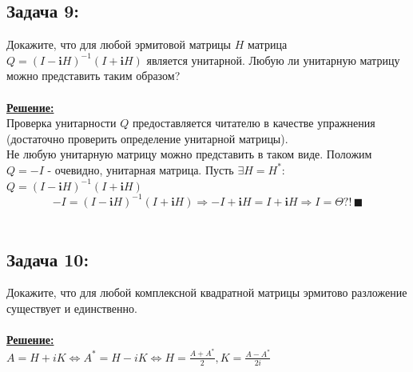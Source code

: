 \documentclass[a4paper,12pt,titlepage,final]{article}
\begin{document}
\subsection*{Задача 9:}
\noindent Докажите, что для любой эрмитовой матрицы $H$ матрица $Q = (I - \textbf{i}H)^{-1}(I + \textbf{i}H)$ является унитарной. Любую ли унитарную матрицу можно представить таким образом?\\ \\
\textbf{\underline{Решение:}} \\
Проверка унитарности $Q$ предоставляется читателю в качестве упражнения (достаточно проверить определение унитарной матрицы). \\
Не любую унитарную матрицу можно представить в таком виде. Положим $Q = -I$ - очевидно, унитарная матрица. Пусть $\exists H = H^*$: $Q = (I - \textbf{i}H)^{-1}(I + \textbf{i}H)$
$$-I = (I - \textbf{i}H)^{-1}(I + \textbf{i}H) \Rightarrow -I + \textbf{i}H = I + \textbf{i}H \Rightarrow I = \Theta \textbf{?!} \, \blacksquare$$ \\

\subsection*{Задача 10:}
\noindent Докажите, что для любой комплексной квадратной матрицы эрмитово разложение существует и единственно.\\ \\
\textbf{\underline{Решение:}} \\
$A = H + iK \Leftrightarrow A^* = H - iK \Leftrightarrow H = \frac{A + A^*}{2}, K = \frac{A - A^*}{2i}$ \blacksquare \\ \\ \\

\end{document}
